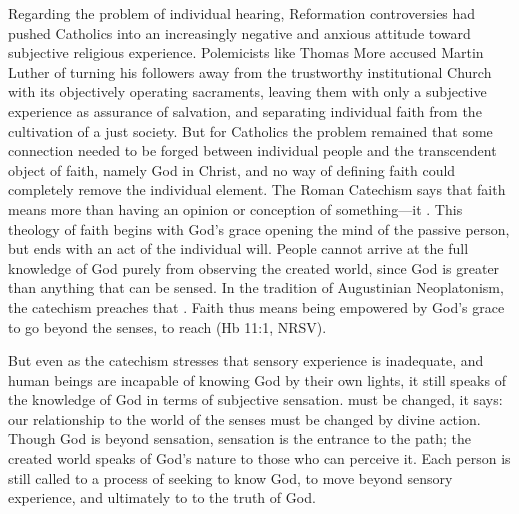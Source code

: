 Regarding the problem of individual hearing, Reformation controversies had
pushed Catholics into an increasingly negative and anxious attitude toward
subjective religious experience.
Polemicists like Thomas More accused Martin Luther of turning his followers away
from the trustworthy institutional Church with its objectively operating
sacraments, leaving them with only a subjective experience as assurance of
salvation, and separating individual faith from the cultivation of a just
society.%
    \Autocite[ch.~4]{Schreiner:Certainty}
But for Catholics the problem remained that some connection needed to be forged
between individual people and the transcendent object of faith, namely God in
Christ, and no way of defining faith could completely remove the individual
element.
The Roman Catechism says that faith means more than having an opinion or
conception of something---it .%
    \Autocite
    [15: .]
    {Catholic:Catechismus1614}
This theology of faith begins with God's grace opening the mind of the passive
person, but ends with an act of the individual will.
People cannot arrive at the full knowledge of God purely from observing the
created world, since God is greater than anything that can be sensed.
In the tradition of Augustinian Neoplatonism, the catechism preaches that
.%
    \Autocite
    [18: .]
    {Catholic:Catechismus1614}
Faith thus means being empowered by God's grace to go beyond the senses, to
reach  (Hb 11:1, NRSV).

But even as the catechism stresses that sensory experience is inadequate, and
human beings are incapable of knowing God by their own lights, it still speaks
of the knowledge of God in terms of subjective sensation.
 must be changed, it says: our relationship to the world of
the senses must be changed by divine action.
Though God is beyond sensation, sensation is the entrance to the path; the
created world speaks of God's nature to those who can perceive it.
Each person is still called to a process of seeking to know God, to move beyond
sensory experience, and ultimately to  to the truth of God.

